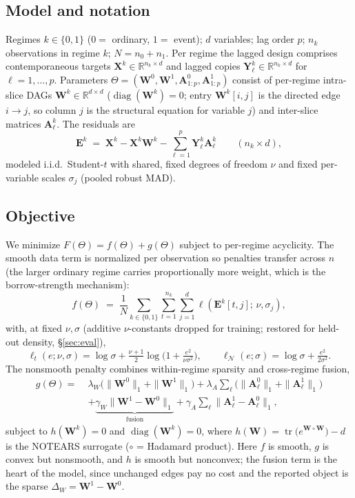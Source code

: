 \documentclass{article}
\newcommand{\W}{\bm{W}}
\newcommand{\A}{\bm{A}}
\newcommand{\X}{\bm{X}}
\newcommand{\Y}{\bm{Y}}
\newcommand{\E}{\bm{E}}
\newcommand{\reals}{\mathbb{R}}
\newcommand{\Wd}{\Delta_{\!W}}
\newcommand{\diag}{\operatorname{diag}}
\newcommand{\tr}{\operatorname{tr}}
\begin{document}
\subsection{Model and notation}
Regimes $k\in\{0,1\}$ ($0=$ ordinary, $1=$ event); $d$ variables; lag order $p$;
$n_k$ observations in regime $k$; $N=n_0+n_1$. Per regime the lagged design comprises
contemporaneous targets $\X^k\in\reals^{n_k\times d}$ and lagged copies
$\Y^k_\ell\in\reals^{n_k\times d}$ for $\ell=1,\dots,p$. Parameters
$\Theta=(\W^0,\W^1,\A^0_{1:p},\A^1_{1:p})$ consist of per-regime intra-slice DAGs
$\W^k\in\reals^{d\times d}$ ($\diag(\W^k){=}0$; entry $\W^k[i,j]$ is the directed
edge $i\!\to\!j$, so column $j$ is the structural equation for variable $j$) and
inter-slice matrices $\A^k_\ell$. The residuals are
\begin{equation}
  \E^k \;=\; \X^k - \X^k\W^k - \sum_{\ell=1}^{p}\Y^k_\ell\A^k_\ell
  \qquad (n_k\times d),
\end{equation}
modeled i.i.d.\ Student-$t$ with shared, fixed degrees of freedom $\nu$ and fixed
per-variable scales $\sigma_j$ (pooled robust MAD).

\subsection{Objective}
We minimize $F(\Theta)=f(\Theta)+g(\Theta)$ subject to per-regime acyclicity. The
smooth data term is normalized per observation so penalties transfer across
$n$ (the larger ordinary regime carries proportionally more weight, which is the
borrow-strength mechanism):
\begin{equation}
  f(\Theta) \;=\; \frac{1}{N}\sum_{k\in\{0,1\}}\sum_{t=1}^{n_k}\sum_{j=1}^{d}
  \ell\!\left(\E^k[t,j];\,\nu,\sigma_j\right),
\end{equation}
with, at fixed $\nu,\sigma$ (additive $\nu$-constants dropped for training; restored
for held-out density, \S\ref{sec:eval}),
\begin{equation}
  \ell_{t}(e;\nu,\sigma)=\log\sigma+\tfrac{\nu+1}{2}\log\!\Big(1+\tfrac{e^2}{\nu\sigma^2}\Big),
  \qquad
  \ell_{\mathcal N}(e;\sigma)=\log\sigma+\tfrac{e^2}{2\sigma^2}.
\end{equation}
The nonsmooth penalty combines within-regime sparsity and cross-regime fusion,
\begin{equation}
\begin{aligned}
  g(\Theta)=\;&\lambda_W\big(\|\W^0\|_1+\|\W^1\|_1\big)
  +\lambda_A\!\sum_\ell\big(\|\A^0_\ell\|_1+\|\A^1_\ell\|_1\big)\\
  &+\underbrace{\gamma_W\|\W^1-\W^0\|_1}_{\text{fusion}}
  +\gamma_A\!\sum_\ell\|\A^1_\ell-\A^0_\ell\|_1,
\end{aligned}
\end{equation}
subject to $h(\W^k)=0$ and $\diag(\W^k)=0$, where $h(\W)=\tr\!\big(e^{\W\circ\W}\big)-d$
is the NOTEARS surrogate ($\circ$ = Hadamard product). Here $f$ is smooth, $g$ is
convex but nonsmooth, and $h$ is smooth but nonconvex; the fusion term is the heart of
the model, since unchanged edges pay no cost and the reported object is the sparse
$\Wd=\W^1-\W^0$.
\end{document}
